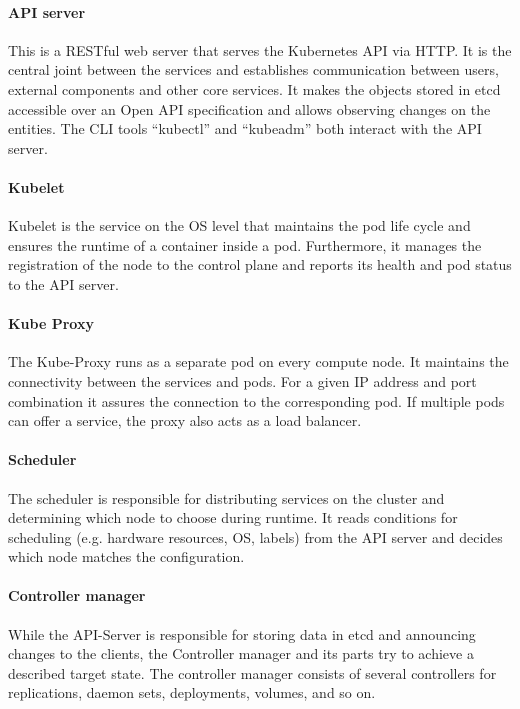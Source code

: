 \paragraph*{API server}
This is a RESTful web server that serves the Kubernetes \ac{API} via \ac{HTTP}\cite{Kubernetes.20221024}. It is the central joint between the services and establishes communication between users, external components and other core services. It makes the objects stored in etcd accessible over an Open \ac{API} specification\cite{Luksa.2018,OpenAPIInitiative.20230210} and allows observing changes on the entities. The \ac{CLI} tools \enquote{kubectl} and \enquote{kubeadm} both interact with the \ac{API} server.

\paragraph*{Kubelet} Kubelet is the service on the \ac{OS} level that maintains the pod life cycle and ensures the runtime of a container inside a pod. Furthermore, it manages the registration of the node to the control plane and reports its health and pod status to the \ac{API} server.

\paragraph*{Kube Proxy} The Kube-Proxy runs as a separate pod on every compute node. It maintains the connectivity between the services and pods\cite{Luksa.2018}. For a given \ac{IP} address and port combination it assures the connection to the corresponding pod. If multiple pods can offer a service, the proxy also acts as a load balancer\cite{Luksa.2018}.

\paragraph*{Scheduler} The scheduler is responsible for distributing services on the cluster and determining which node to choose during runtime. It reads conditions for scheduling (e.g. hardware resources, \ac{OS}, labels) from the \ac{API} server and decides which node matches the configuration\cite{Luksa.2018}.

\paragraph*{Controller manager} While the \ac{API}-Server is responsible for storing data in etcd and announcing changes to the clients, the Controller manager and its parts try to achieve a described target state\cite{Luksa.2018}. The controller manager consists of several controllers for replications, daemon sets, deployments, volumes, and so on.


